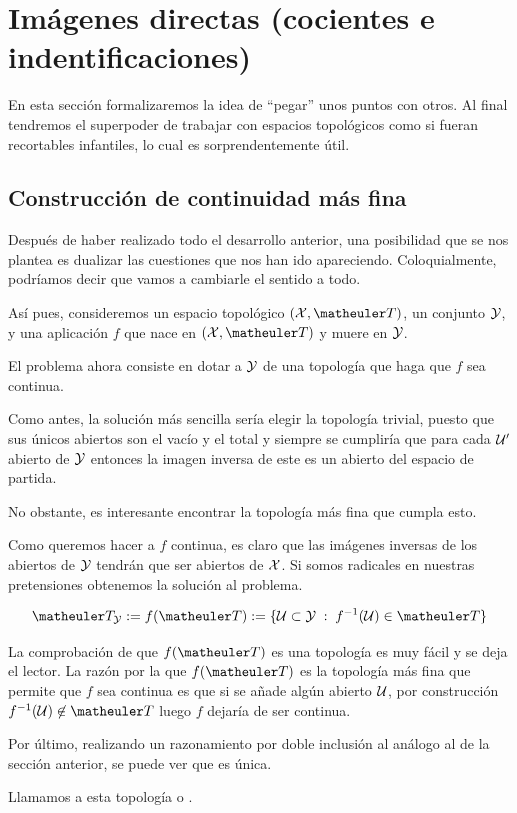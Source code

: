 \section{Imágenes directas (cocientes e indentificaciones)}
En esta sección formalizaremos la idea de ``pegar'' unos puntos con otros. Al final tendremos el superpoder de trabajar con espacios topológicos como si fueran recortables infantiles, lo cual es sorprendentemente útil.
\subsection{Construcción de continuidad más fina}
Después de haber realizado todo el desarrollo anterior, una posibilidad que se nos plantea es dualizar las cuestiones que nos han ido apareciendo. Coloquialmente, podríamos decir que vamos a cambiarle el sentido a todo.

Así pues, consideremos un espacio topológico $(\X,\T)$, un conjunto $\mathcal{Y}$, y una aplicación $f$ que nace en $(\X,\T)$ y muere en $\mathcal{Y}$.

El problema ahora consiste en dotar a $\mathcal{Y}$ de una topología que haga que $f$ sea continua.

\begin{obs}
	Como antes, la solución más sencilla sería elegir la topología trivial, puesto que sus únicos abiertos son el vacío y el total y siempre se cumpliría que para cada $\mathcal{U}'$ abierto de $\mathcal{Y}$ entonces la imagen inversa de este es un abierto del espacio de partida.
\end{obs}

No obstante, es interesante encontrar la topología más fina que cumpla esto.

Como queremos hacer a $f$ continua, es claro que las imágenes inversas de los abiertos de $\mathcal{Y}$ tendrán que ser abiertos de $\mathcal{X}$. Si somos radicales en nuestras pretensiones obtenemos la solución al problema.

\[\T_\Y:=f(\T):=\{\U\subset \Y\midc f^{-1}(\U)\in \T\}\]

La comprobación de que $f(\T)$ es una topología es muy fácil y se deja el lector. La razón por la que $f(\T)$ es la topología más fina que permite que $f$ sea continua es que si se añade algún abierto $\mathcal{U}$, por construcción $f^{-1}(\U)\not\in\T$ luego $f$ dejaría de ser continua.

Por último, realizando un razonamiento por doble inclusión al análogo al de la sección anterior, se puede ver que es única.

Llamamos a esta topología  o .

